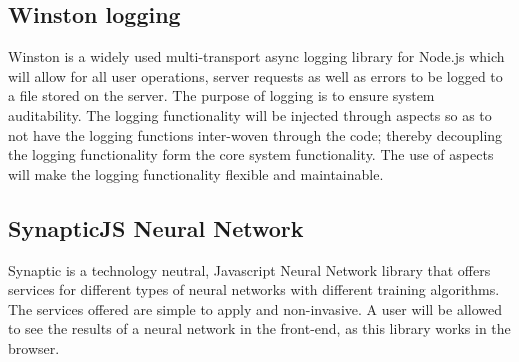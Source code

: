 \subsection{Winston logging}
Winston is a widely used multi-transport async logging library for Node.js which will allow for all user operations, server requests as well as errors to be logged to a file stored on the server. The purpose of logging is to ensure system auditability. The logging functionality will be injected through aspects so as to not have the logging functions inter-woven through the code; thereby decoupling the logging functionality form the core system functionality. The use of aspects will make the logging functionality flexible and maintainable.


\subsection{SynapticJS Neural Network}
Synaptic is a technology neutral, Javascript Neural Network library that offers services for different types of neural networks with different training algorithms. The services offered are simple to apply and non-invasive. A user will be allowed to see the results of a neural network in the front-end, as this library works in the browser.







